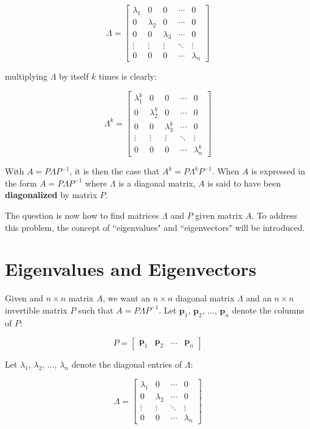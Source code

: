 \documentclass{article}
\begin{document}
\[\Lambda  = \begin{bmatrix} 
\lambda_1 & 0 & 0 & \cdots & 0 \\ 
0 & \lambda_2 & 0 & \cdots & 0 \\ 
0 & 0 & \lambda_3 & \cdots & 0 \\ 
\vdots & \vdots & \vdots & \ddots & \vdots \\
0 & 0 & 0 & \cdots & \lambda_n \end{bmatrix}\]

multiplying \(\Lambda\) by itself \(k\) times is clearly:

\[\Lambda^k  = \begin{bmatrix} 
\lambda_1^k & 0 & 0 & \cdots & 0 \\ 
0 & \lambda_2^k & 0 & \cdots & 0 \\ 
0 & 0 & \lambda_3^k & \cdots & 0 \\ 
\vdots & \vdots & \vdots & \ddots & \vdots \\
0 & 0 & 0 & \cdots & \lambda_n^k \end{bmatrix}\]

With \(A = P \Lambda P^{-1}\), it is then the case that \(A^k = P \Lambda^k P^{-1}\). When \(A\) is expressed in the form \(A = P \Lambda P^{-1}\) where \(\Lambda\) is a diagonal matrix, \(A\) is said to have been {\bf diagonalized} by matrix \(P\).

The question is now how to find matrices \(\Lambda\) and \(P\) given matrix \(A\). To address this problem, the concept of ``eigenvalues" and ``eigenvectors" will be introduced. 




\section*{Eigenvalues and Eigenvectors}

Given and \(n \times n\) matrix \(A\), we want an \(n \times n\) diagonal matrix \(\Lambda\) and an \(n \times n\) invertible matrix \(P\) such that \(A = P\Lambda P^{-1}\). Let \(\mathbf{p}_1\), \(\mathbf{p}_2\), ..., \(\mathbf{p}_n\) denote the columns of \(P\):

\[P = \begin{bmatrix} \mathbf{p}_1 & \mathbf{p}_2 & ... & \mathbf{p}_n \end{bmatrix}\]

Let \(\lambda_1\), \(\lambda_2\), ..., \(\lambda_n\) denote the diagonal entries of \(\Lambda\):

\[\Lambda = \begin{bmatrix} \lambda_1 & 0 & \cdots & 0 \\ 0 & \lambda_2 & \cdots & 0 \\ \vdots & \vdots & \ddots & \vdots \\ 0 & 0 & \cdots & \lambda_n \end{bmatrix}\] 
\end{document}
